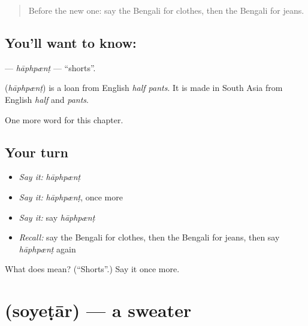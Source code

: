 \label{lesson:BN-C164-haphpnt}



\begin{quote}
Before the new one: say the Bengali for clothes, then the Bengali for jeans.
\end{quote}

\subsection*{You'll want to know: }
\textbf{} — \emph{hāphpænṭ} — \textquotedblleft{}shorts\textquotedblright{}.

\begin{cousinweb}
\textbf{} (\emph{hāphpænṭ}) is a loan from English \emph{half pants}. It is made in South Asia from English \emph{half} and \emph{pants}.
\end{cousinweb}

\begin{grammarlens}[title={What you've built}]
One more word for this chapter.
\end{grammarlens}

\subsection*{Your turn}
\begin{itemize}
\raggedright
  \item \emph{Say it:} \emph{hāphpænṭ}
  \item \emph{Say it:} \emph{hāphpænṭ}, once more
  \item \emph{Say it:} say \emph{hāphpænṭ}
  \item \emph{Recall:} say the Bengali for clothes, then the Bengali for jeans, then say \emph{hāphpænṭ} again
\end{itemize}

\begin{tcolorbox}[breakable,colback=teal!4,colframe=teal!35!black,title={Before you move on}]
What does  mean? (\textquotedblleft{}Shorts\textquotedblright{}.) Say it once more.
\end{tcolorbox}
\section[\texorpdfstring{\bn{সোয়েটার} (soyeṭār)}{সোয়েটার (soyeṭār)}]{ (soyeṭār) — a sweater}

\label{lesson:BN-C164-soyetar}



